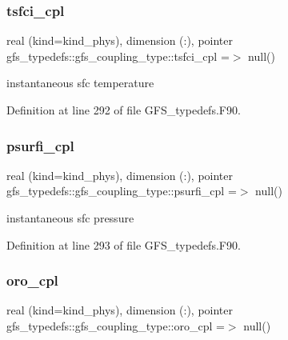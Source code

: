 \mbox{\label{structgfs__typedefs_1_1gfs__coupling__type_a7b1e1a41834ff2f76798f90a20c31de0}} 
\subsubsection{tsfci\+\_\+cpl}
{\footnotesize\ttfamily real (kind=kind\+\_\+phys), dimension  (\+:), pointer gfs\+\_\+typedefs\+::gfs\+\_\+coupling\+\_\+type\+::tsfci\+\_\+cpl =$>$ null()}



instantaneous sfc temperature 



Definition at line 292 of file G\+F\+S\+\_\+typedefs.\+F90.

\mbox{\label{structgfs__typedefs_1_1gfs__coupling__type_a6d20b2f8a336c0d1f7b45dcee8a7ce7e}} 
\subsubsection{psurfi\+\_\+cpl}
{\footnotesize\ttfamily real (kind=kind\+\_\+phys), dimension (\+:), pointer gfs\+\_\+typedefs\+::gfs\+\_\+coupling\+\_\+type\+::psurfi\+\_\+cpl =$>$ null()}



instantaneous sfc pressure 



Definition at line 293 of file G\+F\+S\+\_\+typedefs.\+F90.

\mbox{\label{structgfs__typedefs_1_1gfs__coupling__type_a26dd44d22cbb72f5e2a00b8c5186d9d8}} 
\subsubsection{oro\+\_\+cpl}
{\footnotesize\ttfamily real (kind=kind\+\_\+phys), dimension    (\+:), pointer gfs\+\_\+typedefs\+::gfs\+\_\+coupling\+\_\+type\+::oro\+\_\+cpl =$>$ null()}



